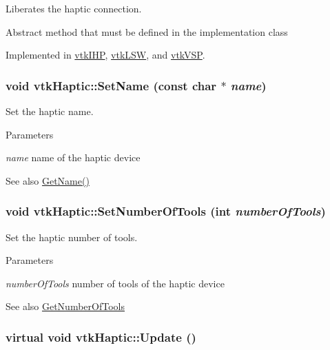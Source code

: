 Liberates the haptic connection. 

Abstract method that must be defined in the implementation class 

Implemented in \hyperlink{classvtkIHP_a7b0ac0f3e862d015fa3f27489679aad3}{vtkIHP}, \hyperlink{classvtkLSW_a69520b1ae3e7549094ba60eb55a41cdf}{vtkLSW}, and \hyperlink{classvtkVSP_a91bfd5c41c807ab1dcbff59ff56a4d72}{vtkVSP}.

\hypertarget{classvtkHaptic_a03c7815125924b8771372879ad367e09}{
\subsubsection[{SetName}]{\setlength{\rightskip}{0pt plus 5cm}void vtkHaptic::SetName (const char $\ast$ {\em name})}}
\label{classvtkHaptic_a03c7815125924b8771372879ad367e09}


Set the haptic name. 


\begin{DoxyParams}{Parameters}
\item[{\em name}]name of the haptic device \end{DoxyParams}
\begin{DoxySeeAlso}{See also}
\hyperlink{classvtkHaptic_abdf00bb1f22ee8c984982c4e90c729a5}{GetName()} 
\end{DoxySeeAlso}
\hypertarget{classvtkHaptic_a2c0be36812179261262d89ae91c31013}{
\subsubsection[{SetNumberOfTools}]{\setlength{\rightskip}{0pt plus 5cm}void vtkHaptic::SetNumberOfTools (int {\em numberOfTools})}}
\label{classvtkHaptic_a2c0be36812179261262d89ae91c31013}


Set the haptic number of tools. 


\begin{DoxyParams}{Parameters}
\item[{\em numberOfTools}]number of tools of the haptic device \end{DoxyParams}
\begin{DoxySeeAlso}{See also}
\hyperlink{classvtkHaptic_a6572234c6e1448d8244d1ae7ebad4985}{GetNumberOfTools} 
\end{DoxySeeAlso}
\hypertarget{classvtkHaptic_ae05171fc9104c679ebd3bad356104fdb}{
\subsubsection[{Update}]{\setlength{\rightskip}{0pt plus 5cm}virtual void vtkHaptic::Update ()}}
\label{classvtkHaptic_ae05171fc9104c679ebd3bad356104fdb}



